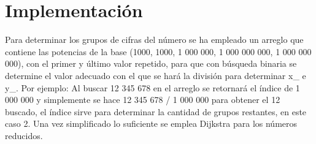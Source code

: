 \section{Implementaci\'on}

Para determinar los grupos de cifras del número se ha empleado un arreglo que contiene las potencias de la base (1000, 1000, 1 000 000, 1 000 000 000,  1 000 000 000), con el primer y último valor repetido, para que con búsqueda binaria se determine el valor adecuado con el que se hará la división para determinar x\_ e y\_. Por ejemplo: Al buscar 12 345 678 en el arreglo se retornará el índice de 1 000 000 y simplemente se hace 12 345 678 / 1 000 000 para obtener el 12 buscado, el índice sirve para determinar la cantidad de grupos restantes, en este caso 2.
Una vez simplificado lo suficiente se emplea Dijkstra para los números reducidos.

